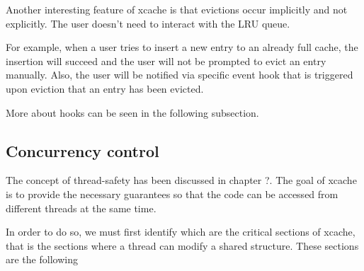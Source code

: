 Another interesting feature of xcache is that evictions occur implicitly and not 
explicitly. The user doesn't need to interact with the LRU queue.

For example, when a user tries to insert a new entry to an already full cache, 
the insertion will succeed and the user will not be prompted to evict an entry 
manually. Also, the user will be notified via specific event hook that is 
triggered upon eviction that an entry has been evicted.

More about hooks can be seen in the following subsection.

\begin{comment}
\subsection{Hooks}


The hooks that xcache provides to users are:

\begin{itemize}
	\item on\_ init: called on cache entry initialization.
	\item on\_put: called when the last reference to the cache entry is put
	\item on\_evict: called when a cache entry is evicted.
	\item on\_node\_init: called on initial node preparation.
	\item post\_evict: called after an eviction has occurred, with cache  
		lock held.
	\item on\_free: called when a cache entry is freed.
	\item on\_finalize: called to hint the user that the cache entry's ref 
		has dropped to zero.
	\item on\_reinsert: called when a cache entry has been in cache
\end{itemize}

\end{comment}

\subsection{Concurrency control}

The concept of thread-safety has been discussed in chapter ?. The goal of xcache 
is to provide the necessary guarantees so that the code can be accessed from 
different threads at the same time.

In order to do so, we must first identify which are the critical sections of 
xcache, that is the sections where a thread can modify a shared structure. These 
sections are the following

